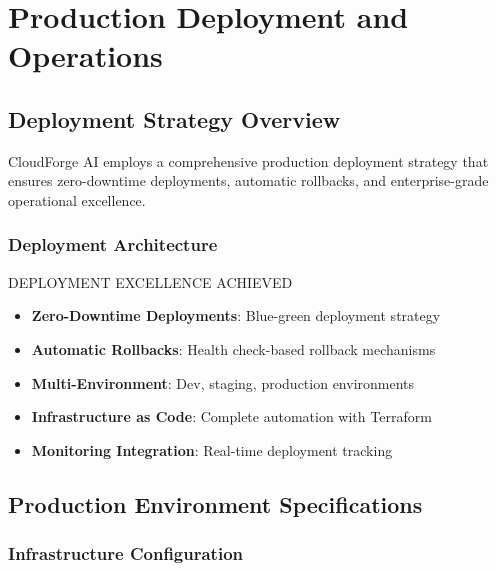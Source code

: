 \chapter{Production Deployment and Operations}

\section{Deployment Strategy Overview}

CloudForge AI employs a comprehensive production deployment strategy that ensures zero-downtime deployments, automatic rollbacks, and enterprise-grade operational excellence.

\subsection{Deployment Architecture}

\begin{sprintbox}{DEPLOYMENT EXCELLENCE ACHIEVED}
\begin{itemize}
    \item \textbf{Zero-Downtime Deployments}: Blue-green deployment strategy
    \item \textbf{Automatic Rollbacks}: Health check-based rollback mechanisms
    \item \textbf{Multi-Environment}: Dev, staging, production environments
    \item \textbf{Infrastructure as Code}: Complete automation with Terraform
    \item \textbf{Monitoring Integration}: Real-time deployment tracking
\end{itemize}
\end{sprintbox}

\section{Production Environment Specifications}

\subsection{Infrastructure Configuration}

